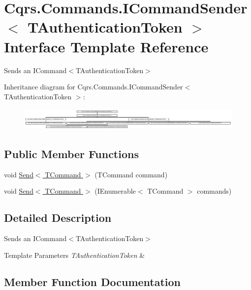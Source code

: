 \hypertarget{interfaceCqrs_1_1Commands_1_1ICommandSender}{}\section{Cqrs.\+Commands.\+I\+Command\+Sender$<$ T\+Authentication\+Token $>$ Interface Template Reference}
\label{interfaceCqrs_1_1Commands_1_1ICommandSender}


Sends an I\+Command$<$\+T\+Authentication\+Token$>$  


Inheritance diagram for Cqrs.\+Commands.\+I\+Command\+Sender$<$ T\+Authentication\+Token $>$\+:\begin{figure}[H]
\begin{center}
\leavevmode
\includegraphics[height=1.159420cm]{interfaceCqrs_1_1Commands_1_1ICommandSender}
\end{center}
\end{figure}
\subsection*{Public Member Functions}
\begin{DoxyCompactItemize}
\item 
void \hyperlink{interfaceCqrs_1_1Commands_1_1ICommandSender_a551d69f8679399fc0ce0fd99dead507a}{Send$<$ T\+Command $>$} (T\+Command command)
\item 
void \hyperlink{interfaceCqrs_1_1Commands_1_1ICommandSender_a3fb3ec40a3e862f721a7c9204e67e832}{Send$<$ T\+Command $>$} (I\+Enumerable$<$ T\+Command $>$ commands)
\end{DoxyCompactItemize}


\subsection{Detailed Description}
Sends an I\+Command$<$\+T\+Authentication\+Token$>$ 


\begin{DoxyTemplParams}{Template Parameters}
{\em T\+Authentication\+Token} & \\
\hline
\end{DoxyTemplParams}


\subsection{Member Function Documentation}
\mbox{\label{interfaceCqrs_1_1Commands_1_1ICommandSender_a551d69f8679399fc0ce0fd99dead507a}} 
